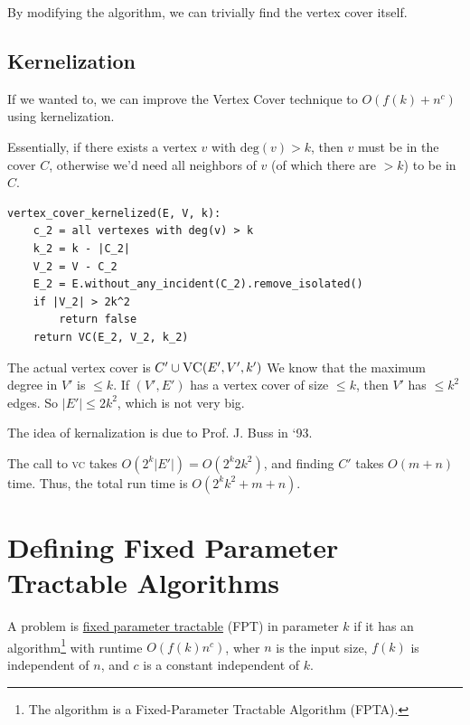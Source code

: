                     By modifying the algorithm, we can trivially find the vertex cover itself.
                \subsection{Kernelization} %
                \label{sub:kernelization}
                    If we wanted to, we can improve the Vertex Cover technique to $O(f(k) + n^c)$ using kernelization.

                    Essentially, if there exists a vertex $v$ with $\text{deg}(v) > k$, then $v$ must be in the cover $C$, otherwise we'd need all neighbors of $v$ (of which there are $>k$) to be in $C$.
                    \begin{lstlisting}
vertex_cover_kernelized(E, V, k):
    c_2 = all vertexes with deg(v) > k
    k_2 = k - |C_2|
    V_2 = V - C_2
    E_2 = E.without_any_incident(C_2).remove_isolated()
    if |V_2| > 2k^2
        return false
    return VC(E_2, V_2, k_2)
                    \end{lstlisting}
                    The actual vertex cover is $C' \cup \textsc{VC}(E', V', k')$
                    We know that the maximum degree in $V'$ is $\le k$.
                    If $(V', E')$ has a vertex cover of size $\le k$, then $V'$ has $\le k^2$ edges.
                    So $|E'| \le 2k^2$, which is not very big.

                    The idea of kernalization is due to Prof. J. Buss in `93.

                    The call to \textsc{vc} takes $O(2^k |E'|) = O(2^k 2 k^2)$, and finding $C'$ takes $O(m + n)$ time.
                    Thus, the total run time is $O(2^k k^2 + m + n)$.
            \section{Defining Fixed Parameter Tractable Algorithms} %
            \label{sec:defining_fixed_parameter_tractable_algorithms}
                A problem is \uline{fixed parameter tractable} (FPT) in parameter $k$ if it has an algorithm\footnote{The algorithm is a Fixed-Parameter Tractable Algorithm (FPTA).} with runtime $O(f(k) n^c)$, wher $n$ is the input size, $f(k)$ is independent of $n$, and $c$ is a constant independent of $k$.

